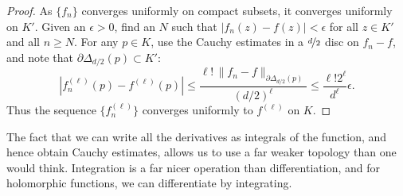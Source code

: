 \documentclass[12pt,openany]{book}
\newcommand{\sabs}[1]{\lvert {#1} \rvert}
\newcommand{\snorm}[1]{\lVert {#1} \rVert}
\newcommand{\abs}[1]{\left\lvert {#1} \right\rvert}
\theoremstyle{plain}
\theoremstyle{remark}
\theoremstyle{definition}
\theoremstyle{exercise}
\theoremstyle{example}
\begin{document}
\begin{proof}
As $\{ f_n \}$ converges uniformly on compact subsets, it converges uniformly
on $K'$.  Given an $\epsilon > 0$, find an $N$ such that 
$\sabs{f_n(z)-f(z)} < \epsilon$ for all $z \in K'$ and
all $n \geq N$.
For any $p \in K$, use the Cauchy estimates in a $\nicefrac{d}{2}$ disc
on $f_n-f$, and note that
$\partial \Delta_{d/2}(p) \subset K'$:
\begin{equation*}
\abs{
f_n^{(\ell)}(p)
-
f^{(\ell)}(p)
}
\leq
\frac{\ell! \, \snorm{f_n-f}_{\partial \Delta_{d/2}(p)}}{{(d/2)}^{\ell}}
\leq
\frac{\ell!2^\ell}{d^\ell}\epsilon .
\end{equation*}
Thus the sequence $\bigl\{ f_n^{(\ell)} \bigr\}$ converges uniformly to $f^{(\ell)}$ on $K$.
\end{proof}

The fact that we can write all the derivatives as
integrals of the function, and hence obtain Cauchy estimates,
allows us to use a far weaker topology than one would think.
Integration is a far nicer operation than differentiation, and for
holomorphic functions, we can differentiate by integrating.
\end{document}
